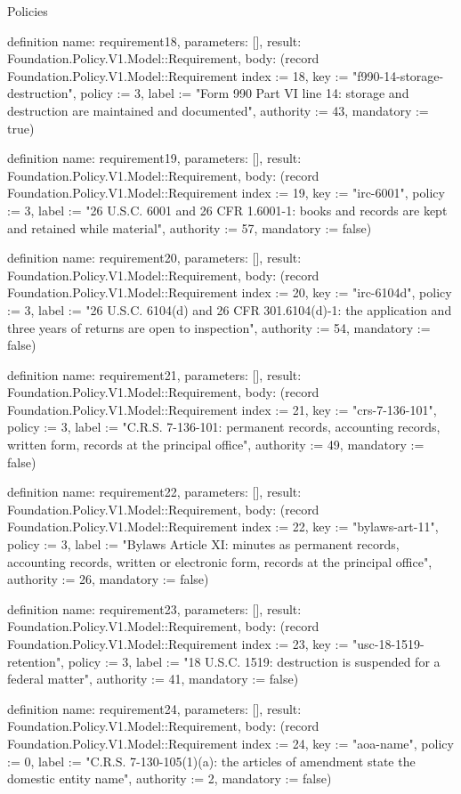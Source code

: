 \begin{lexlean}{Policies}
\begin{semanticmodule}
definition{
  name: requirement18,
  parameters: [],
  result: Foundation.Policy.V1.Model::Requirement,
  body: (record Foundation.Policy.V1.Model::Requirement {index := 18, key := "f990-14-storage-destruction", policy := 3, label := "Form 990 Part VI line 14: storage and destruction are maintained and documented", authority := 43, mandatory := true})
}

definition{
  name: requirement19,
  parameters: [],
  result: Foundation.Policy.V1.Model::Requirement,
  body: (record Foundation.Policy.V1.Model::Requirement {index := 19, key := "irc-6001", policy := 3, label := "26 U.S.C. 6001 and 26 CFR 1.6001-1: books and records are kept and retained while material", authority := 57, mandatory := false})
}

definition{
  name: requirement20,
  parameters: [],
  result: Foundation.Policy.V1.Model::Requirement,
  body: (record Foundation.Policy.V1.Model::Requirement {index := 20, key := "irc-6104d", policy := 3, label := "26 U.S.C. 6104(d) and 26 CFR 301.6104(d)-1: the application and three years of returns are open to inspection", authority := 54, mandatory := false})
}

definition{
  name: requirement21,
  parameters: [],
  result: Foundation.Policy.V1.Model::Requirement,
  body: (record Foundation.Policy.V1.Model::Requirement {index := 21, key := "crs-7-136-101", policy := 3, label := "C.R.S. 7-136-101: permanent records, accounting records, written form, records at the principal office", authority := 49, mandatory := false})
}

definition{
  name: requirement22,
  parameters: [],
  result: Foundation.Policy.V1.Model::Requirement,
  body: (record Foundation.Policy.V1.Model::Requirement {index := 22, key := "bylaws-art-11", policy := 3, label := "Bylaws Article XI: minutes as permanent records, accounting records, written or electronic form, records at the principal office", authority := 26, mandatory := false})
}

definition{
  name: requirement23,
  parameters: [],
  result: Foundation.Policy.V1.Model::Requirement,
  body: (record Foundation.Policy.V1.Model::Requirement {index := 23, key := "usc-18-1519-retention", policy := 3, label := "18 U.S.C. 1519: destruction is suspended for a federal matter", authority := 41, mandatory := false})
}

definition{
  name: requirement24,
  parameters: [],
  result: Foundation.Policy.V1.Model::Requirement,
  body: (record Foundation.Policy.V1.Model::Requirement {index := 24, key := "aoa-name", policy := 0, label := "C.R.S. 7-130-105(1)(a): the articles of amendment state the domestic entity name", authority := 2, mandatory := false})
}


\end{semanticmodule}
\end{lexlean}
